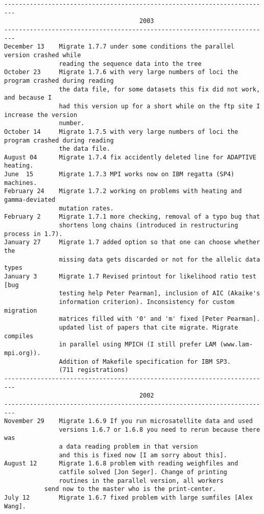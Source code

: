 \begin{small}
\begin{verbatim}
-------------------------------------------------------------------------
                                     2003
-------------------------------------------------------------------------
December 13    Migrate 1.7.7 under some conditions the parallel version crashed while
               reading the sequence data into the tree
October 23     Migrate 1.7.6 with very large numbers of loci the program crashed during reading
               the data file, for some datasets this fix did not work, and because I
               had this version up for a short while on the ftp site I increase the version
               number.
October 14     Migrate 1.7.5 with very large numbers of loci the program crashed during reading
               the data file.
August 04      Migrate 1.7.4 fix accidently deleted line for ADAPTIVE heating.
June  15       Migrate 1.7.3 MPI works now on IBM regatta (SP4) machines.
February 24    Migrate 1.7.2 working on problems with heating and gamma-deviated
               mutation rates.
February 2     Migrate 1.7.1 more checking, removal of a typo bug that 
               shortens long chains (introduced in restructuring process in 1.7). 
January 27     Migrate 1.7 added option so that one can choose whether the
               missing data gets discarded or not for the allelic data types
January 3      Migrate 1.7 Revised printout for likelihood ratio test [bug 
               testing help Peter Pearman], inclusion of AIC (Akaike's 
               information criterion). Inconsistency for custom migration
               matrices filled with '0' and 'm' fixed [Peter Pearman].
               updated list of papers that cite migrate. Migrate compiles 
               in parallel using MPICH (I still prefer LAM (www.lam-mpi.org)). 
               Addition of Makefile specification for IBM SP3. 
               (711 registrations)
-------------------------------------------------------------------------
                                     2002
-------------------------------------------------------------------------
November 29    Migrate 1.6.9 If you run microsatellite data and used 
               versions 1.6.7 or 1.6.8 you need to rerun because there was 
               a data reading problem in that version
               and this is fixed now [I am sorry about this].
August 12      Migrate 1.6.8 problem with reading weighfiles and
               catfile solved [Jon Seger]. Change of printing
               routines in the parallel version, all workers
	       send now to the master who is the print-center.
July 12        Migrate 1.6.7 fixed problem with large sumfiles [Alex Wang].

\end{verbatim}
\end{small}
